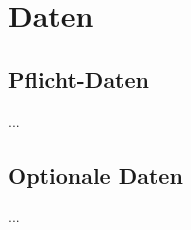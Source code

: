 %
%


\chapter{Daten}
\label{Daten}


\section{Pflicht-Daten}

...
\\


\section{Optionale Daten}

...
\\


